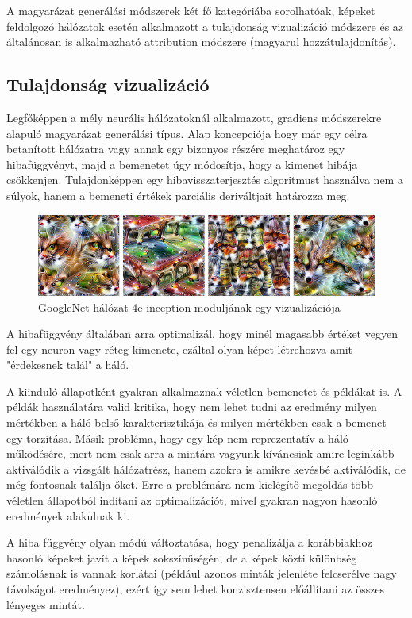 A magyarázat generálási módszerek két fő kategóriába sorolhatóak, képeket feldolgozó hálózatok esetén alkalmazott a tulajdonság vizualizáció módszere és az általánosan is alkalmazható attribution módszere (magyarul hozzátulajdonítás). 

\subsection{Tulajdonság vizualizáció}

Legfőképpen a mély neurális hálózatoknál alkalmazott, gradiens módszerekre alapuló magyarázat generálási típus. Alap koncepciója hogy már egy célra betanított hálózatra vagy annak egy bizonyos részére meghatároz egy hibafüggvényt, majd a bemenetet úgy módosítja, hogy a kimenet hibája csökkenjen. Tulajdonképpen egy hibavisszaterjesztés algoritmust használva nem a súlyok, hanem a bemeneti értékek parciális deriváltjait határozza meg.

\begin{figure}[H]
    \centering
    \includegraphics[width=\linewidth]{figures/feature_visualization.png}
    \caption{GoogleNet hálózat 4e inception moduljának egy vizualizációja}
    \label{fig:featurevisualization}
\end{figure}

A hibafüggvény általában arra optimalizál, hogy minél magasabb értéket vegyen fel egy neuron vagy réteg kimenete, ezáltal olyan képet létrehozva amit "érdekesnek talál" a háló.

A kiinduló állapotként gyakran alkalmaznak véletlen bemenetet és példákat is. A példák használatára valid kritika, hogy nem lehet tudni az eredmény milyen mértékben a háló belső karakterisztikája és milyen mértékben csak a bemenet egy torzítása. Másik probléma, hogy egy kép nem reprezentatív a háló működésére, mert nem csak arra a mintára vagyunk kíváncsiak amire leginkább aktiválódik a vizsgált hálózatrész, hanem azokra is amikre kevésbé aktiválódik, de még fontosnak találja őket. Erre a problémára nem kielégítő megoldás több véletlen állapotból indítani az optimalizációt, mivel gyakran nagyon hasonló eredmények alakulnak ki. 

A hiba függvény olyan módú változtatása, hogy penalizálja a korábbiakhoz hasonló képeket javít a képek sokszínűségén, de a képek közti különbség számolásnak is vannak korlátai (például azonos minták jelenléte felcserélve nagy távolságot eredményez), ezért így sem lehet konzisztensen előállítani az összes lényeges mintát.

